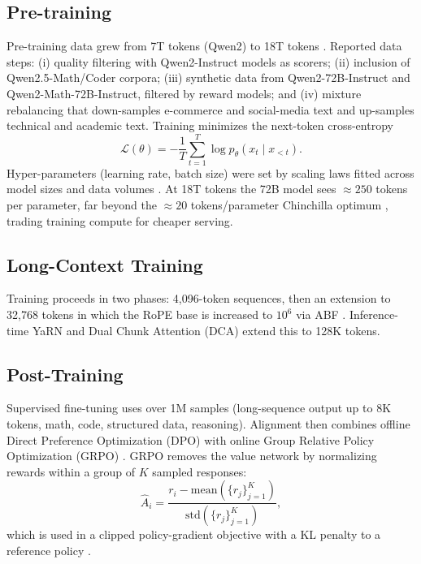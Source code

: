 \documentclass[conference]{IEEEtran}
\begin{document}
\subsection{Pre-training}
Pre-training data grew from 7T tokens (Qwen2) to 18T tokens \cite{qwen25}. Reported data steps: (i) quality filtering with Qwen2-Instruct models as scorers; (ii) inclusion of Qwen2.5-Math/Coder corpora; (iii) synthetic data from Qwen2-72B-Instruct and Qwen2-Math-72B-Instruct, filtered by reward models; and (iv) mixture rebalancing that down-samples e-commerce and social-media text and up-samples technical and academic text. Training minimizes the next-token cross-entropy
\begin{equation}
\mathcal{L}(\theta)=-\frac{1}{T}\sum_{t=1}^{T}\log p_\theta(x_t\mid x_{<t}).
\end{equation}
Hyper-parameters (learning rate, batch size) were set by scaling laws fitted across model sizes and data volumes \cite{qwen25}. At 18T tokens the 72B model sees $\approx 250$ tokens per parameter, far beyond the $\approx 20$ tokens/parameter Chinchilla optimum \cite{chinchilla}, trading training compute for cheaper serving.

\subsection{Long-Context Training}
Training proceeds in two phases: 4,096-token sequences, then an extension to 32,768 tokens in which the RoPE base is increased to $10^6$ via ABF \cite{abf}. Inference-time YaRN \cite{yarn} and Dual Chunk Attention (DCA) \cite{dca} extend this to 128K tokens.

\subsection{Post-Training}
Supervised fine-tuning uses over 1M samples (long-sequence output up to 8K tokens, math, code, structured data, reasoning). Alignment then combines offline Direct Preference Optimization (DPO) \cite{dpo} with online Group Relative Policy Optimization (GRPO) \cite{grpo}. GRPO removes the value network by normalizing rewards within a group of $K$ sampled responses:
\begin{equation}
\hat{A}_i=\frac{r_i-\mathrm{mean}(\{r_j\}_{j=1}^K)}{\mathrm{std}(\{r_j\}_{j=1}^K)},
\end{equation}
which is used in a clipped policy-gradient objective with a KL penalty to a reference policy \cite{grpo}.
\end{document}
